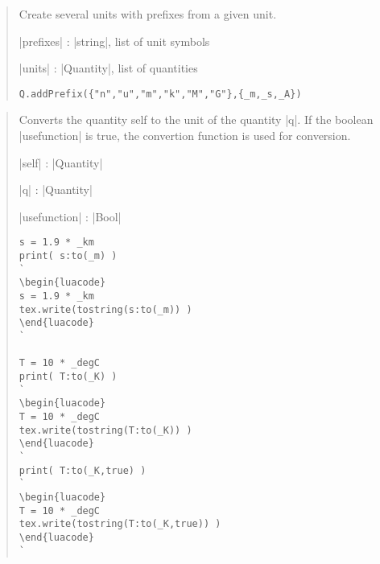 \documentclass{ltxdoc}
\begin{document}
\begin{quote}
  Create several units with prefixes from a given unit.

  \begin{description}
  \item |prefixes| : |string|, list of unit symbols

  \item |units| : |Quantity|, list of quantities
  \end{description}


\begin{lstlisting}
Q.addPrefix({"n","u","m","k","M","G"},{_m,_s,_A})
\end{lstlisting}
\end{quote}



\begin{quote}
  Converts the quantity self to the unit of the quantity |q|. If the boolean |usefunction| is true, the convertion function is used for conversion.

  \begin{description}
  \item |self| : |Quantity| 
  \item |q| : |Quantity|
  \item |usefunction| : |Bool| 
  \end{description}

\begin{lstlisting}
s = 1.9 * _km
print( s:to(_m) )
`
\begin{luacode}
s = 1.9 * _km
tex.write(tostring(s:to(_m)) )
\end{luacode}
`

T = 10 * _degC
print( T:to(_K) )
`
\begin{luacode}
T = 10 * _degC
tex.write(tostring(T:to(_K)) )
\end{luacode}
`
print( T:to(_K,true) )
`
\begin{luacode}
T = 10 * _degC
tex.write(tostring(T:to(_K,true)) )
\end{luacode}
`
\end{lstlisting}

\end{quote}
\end{document}
